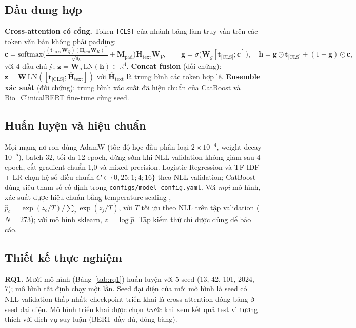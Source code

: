 \subsection{Đầu dung hợp}
\textbf{Cross-attention có cổng.} Token \texttt{[CLS]} của nhánh bảng làm truy vấn trên các token văn bản không phải padding:
\begin{equation}
  \bm{c}=\mathrm{softmax}\!\Big(\tfrac{(\bm{t}_{\text{[CLS]}}\bm{W}_Q)(\bm{H}_{\text{text}}\bm{W}_K)^\top}{\sqrt{d_k}}+\bm{M}_{\text{pad}}\Big)\bm{H}_{\text{text}}\bm{W}_V,\qquad
  \bm{g}=\sigma\big(\bm{W}_g[\bm{t}_{\text{[CLS]}};\bm{c}]\big),\quad
  \bm{h}=\bm{g}\odot\bm{t}_{\text{[CLS]}}+(1-\bm{g})\odot\bm{c},
\end{equation}
với 4 đầu chú ý; $\bm{z}=\bm{W}_o\,\mathrm{LN}(\bm{h})\in\mathbb{R}^4$.
\textbf{Concat fusion} (đối chứng): $\bm{z}=\bm{W}\,\mathrm{LN}([\bm{t}_{\text{[CLS]}};\overline{\bm{H}}_{\text{text}}])$ với $\overline{\bm{H}}_{\text{text}}$ là trung bình các token hợp lệ.
\textbf{Ensemble xác suất} (đối chứng): trung bình xác suất đã hiệu chuẩn của CatBoost và Bio\_ClinicalBERT fine-tune cùng seed.

\subsection{Huấn luyện và hiệu chuẩn}
Mọi mạng nơ-ron dùng AdamW (tốc độ học đầu phân loại $2\times10^{-4}$, weight decay $10^{-5}$), batch 32, tối đa 12 epoch, dừng sớm khi NLL validation không giảm sau 4 epoch, cắt gradient chuẩn 1,0 và mixed precision. Logistic Regression và TF-IDF + LR chọn hệ số điều chuẩn $C\in\{0{,}25;1;4;16\}$ theo NLL validation; CatBoost dùng siêu tham số cố định trong \texttt{configs/model\_config.yaml}. Với \emph{mọi} mô hình, xác suất được hiệu chuẩn bằng temperature scaling \cite{guo2017calibration}, $\hat p_c=\exp(z_c/T)/\sum_j\exp(z_j/T)$, với $T$ tối ưu theo NLL trên tập validation ($N=273$); với mô hình sklearn, $z=\log\hat p$. Tập kiểm thử chỉ được dùng để báo cáo.

\subsection{Thiết kế thực nghiệm}
\textbf{RQ1.} Mười mô hình (Bảng~\ref{tab:rq1}) huấn luyện với 5 seed (13, 42, 101, 2024, 7); mô hình tất định chạy một lần. Seed đại diện của mỗi mô hình là seed có NLL validation thấp nhất; checkpoint triển khai là cross-attention đóng băng ở seed đại diện. Mô hình triển khai được chọn \emph{trước} khi xem kết quả test vì tương thích với dịch vụ suy luận (BERT đầy đủ, đóng băng).

